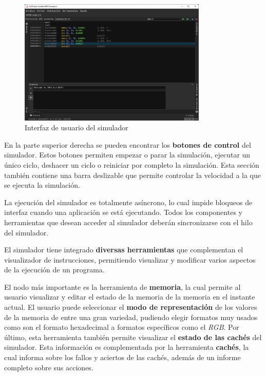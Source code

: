 \begin{figure}[h]
    \centering
    \includegraphics[width=0.8\textwidth]{images/mips/jams-simulation}
    \caption{Interfaz de usuario del simulador}
    \label{fig:jams-simulation}
\end{figure}

En la parte superior derecha se pueden encontrar los
\textbf{botones de control} del simulador.
Estos botones permiten empezar o parar la simulación, ejecutar un
único ciclo, deshacer un ciclo o reiniciar por completo la simulación.
Esta sección también contiene una barra deslizable que permite controlar
la velocidad a la que se ejecuta la simulación.

La ejecución del simulador es totalmente asíncrono, lo cual
impide bloqueos de interfaz cuando una aplicación se está ejecutando.
Todos los componentes y herramientas que desean acceder al simulador
deberán sincronizarse con el hilo del simulador.

El simulador tiene integrado \textbf{diversas herramientas} que complementan
el visualizador de instrucciones, permitiendo visualizar y modificar varios
aspectos de la ejecución de un programa.

El nodo más importante es la herramienta de \textbf{memoria},
la cual permite al usuario visualizar y editar el estado de la memoria
de la memoria en el instante actual.
El usuario puede seleccionar el \textbf{modo de representación} de los valores
de la memoria de entre una gran variedad, pudiendo elegir formatos
muy usados como son el formato hexadecimal a formatos específicos
como el \textit{RGB}.
Por último, esta herramienta también permite visualizar el \textbf{estado
de las cachés} del simulador.
Esta información es complementada por la herramienta \textbf{cachés},
la cual informa sobre los fallos y aciertos de las cachés, además de un
informe completo sobre sus acciones.


